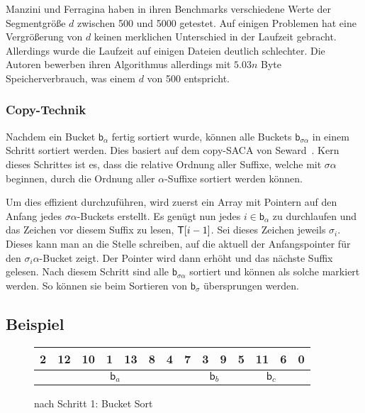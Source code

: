 Manzini und Ferragina haben in ihren Benchmarks verschiedene Werte der Segmentgröße $d$ zwischen 500 und 5000 getestet.
Auf einigen Problemen hat eine Vergrößerung von $d$ keinen merklichen Unterschied in der Laufzeit gebracht.
Allerdings wurde die Laufzeit auf einigen Dateien deutlich schlechter.
Die Autoren bewerben ihren Algorithmus allerdings mit $5.03n$ Byte Speicherverbrauch, was einem $d$ von 500 entspricht.

\subsubsection{Copy-Technik}
\label{ds:copy}

Nachdem ein Bucket $\mathsf{b}_\alpha$ fertig sortiert wurde, können alle Buckets $\mathsf{b}_{\sigma\alpha}$ in einem Schritt sortiert werden.
Dies basiert auf dem copy-SACA von Seward~\cite{seward2000}.
Kern dieses Schrittes ist es, dass die relative Ordnung aller Suffixe,
welche mit $\sigma\alpha$ beginnen, durch die Ordnung aller $\alpha$-Suffixe sortiert werden können.

Um dies effizient durchzuführen, wird zuerst ein Array mit Pointern auf
den Anfang jedes $\sigma\alpha$-Buckets erstellt.
Es genügt nun jedes $i \in \mathsf{b}_\alpha$ zu durchlaufen und das Zeichen
vor diesem Suffix zu lesen, $\inputtext[i - 1]$.
Sei dieses Zeichen jeweils $\sigma_i$.
Dieses kann man an die Stelle schreiben, auf die aktuell der Anfangspointer für den $\sigma_i\alpha$-Bucket zeigt.
Der Pointer wird dann erhöht und das nächste Suffix gelesen.
Nach diesem Schritt sind alle $\mathsf{b}_{\sigma\alpha}$ sortiert und können als solche markiert werden.
So können sie beim Sortieren von $\mathsf{b}_\sigma$ übersprungen werden.

\subsection{Beispiel}

\begin{figure}[!ht]
\centering
\begin{tabular}{|c|c|c|c|c|c|c|c|c|c|c|c|c|c|}
\hline
2 & 12 & 10 & 1 & 13 & 8 & 4 & 7 & 3 & 9 & 5 & 11 & 6 & 0 \\
\hline
\multicolumn{8}{|c|}{$\mathsf{b}_a$} & \multicolumn{2}{c|}{$\mathsf{b}_b$} & \multicolumn{4}{c|}{$\mathsf{b}_c$} \\
\hline
\end{tabular}
\caption{\sa nach Schritt 1: Bucket Sort}
\label{ds:beispiel1}
\end{figure}

